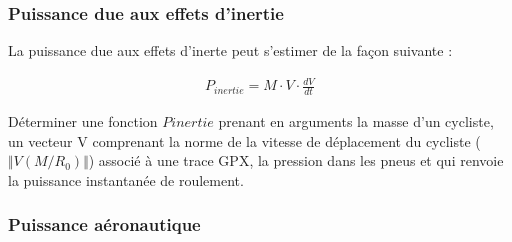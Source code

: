 \subsubsection{Puissance due aux effets d'inertie}

La puissance due aux effets d'inerte peut s'estimer de la façon suivante : 

\begin{align*}
P_{inertie}=M\cdot V\cdot \frac{dV}{dt}
\end{align*}

\question{} Déterminer une fonction $Pinertie$ prenant en arguments la masse d'un cycliste, un vecteur V comprenant la norme de la vitesse de déplacement du cycliste ($\Vert V(M/R_0)\Vert$) associé à une trace GPX, la pression dans les pneus et qui renvoie la puissance instantanée de roulement.

\subsubsection{Puissance aéronautique}


